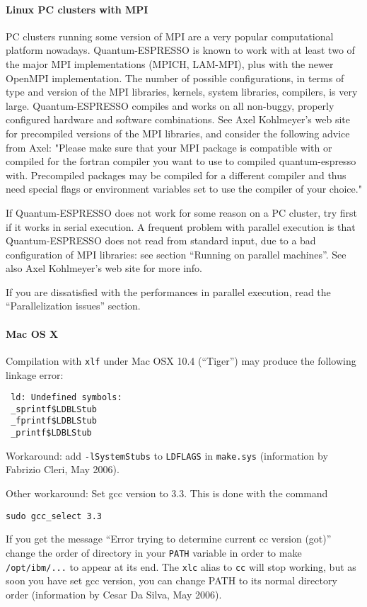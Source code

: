 \documentclass[12pt,a4paper]{article}
\begin{document}
\paragraph{Linux PC clusters with MPI}

PC clusters running some version of MPI are a very popular 
computational platform nowadays. Quantum-ESPRESSO is known to work
with at least two of the major MPI implementations (MPICH, LAM-MPI), 
plus with the newer OpenMPI implementation. 
The number of possible configurations, in terms of type and version of 
the MPI libraries, kernels, system libraries, compilers, is very large. 
Quantum-ESPRESSO compiles and works on all non-buggy, properly configured 
hardware and software combinations. 
See Axel Kohlmeyer's web site for precompiled versions of the MPI libraries, 
and consider the following advice from Axel:
"Please make sure that your MPI package is compatible with or compiled
for the fortran compiler you want to use to compiled quantum-espresso with.
Precompiled packages may be compiled for a different compiler and thus
need special flags or environment variables set to use the compiler of
your choice."

If Quantum-ESPRESSO does not work for some reason on a PC cluster, try first 
if it works in serial execution. A frequent problem with parallel execution
is that Quantum-ESPRESSO does not read from standard input, due to a bad 
configuration of MPI libraries: see section ``Running on parallel machines''.
See also Axel Kohlmeyer's web site for more info.      

If you are dissatisfied with the performances in parallel 
execution, read the ``Parallelization issues'' section.

\paragraph{Mac OS X}

Compilation with \texttt{xlf} under Mac OSX 10.4 (``Tiger'') may produce
the following linkage error:
\begin{verbatim}
 ld: Undefined symbols:
 _sprintf$LDBLStub
 _fprintf$LDBLStub
 _printf$LDBLStub
\end{verbatim}
Workaround: add \texttt{-lSystemStubs} to \texttt{LDFLAGS} in 
\texttt{make.sys} (information by Fabrizio Cleri, May 2006). 

Other workaround: Set gcc version to 3.3. This is done with the command
\begin{verbatim}
sudo gcc_select 3.3
\end{verbatim}
If you get the message ``Error trying to determine current cc version (got)'' 
change the order of directory in your \texttt{PATH} variable in order to make
\texttt{/opt/ibm/...} to appear at its end. The \texttt{xlc} alias to 
\texttt{cc} will stop working, but as soon you have set gcc version,
you can change PATH to its normal directory order (information by Cesar 
Da Silva, May 2006).
\end{document}
